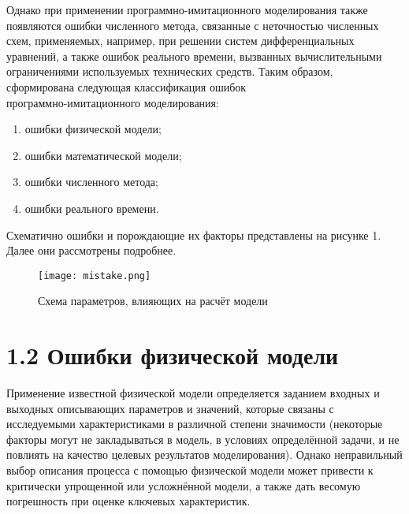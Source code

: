 {\begin{onehalfspace}
\begin{enumerate}
	\end{enumerate} 

 Однако при применении программно-имитационного моделирования также появляются ошибки численного метода, связанные с неточностью численных схем, применяемых, например, при решении систем дифференциальных уравнений, а также ошибок реального времени, вызванных вычислительными ограничениями используемых технических средств.
Таким образом, сформирована следующая классификация ошибок \\ программно-имитационного моделирования:
\begin{enumerate}
	\item	ошибки физической модели;
\item	ошибки математической модели;
\item	ошибки численного метода;
\item	ошибки реального времени.
\end{enumerate} 

   
Схематично ошибки и порождающие их факторы представлены на рисунке 1. Далее они рассмотрены подробнее.
 
		\begin{center}
		\begin{figure}[h]
			\centering
			\texttt{[image: mistake.png]}
			\caption{Схема параметров, влияющих на расчёт модели}
			\label{fig:model2}
		\end{figure}
	\end{center}
     
    \section*{\large{1.2	Ошибки физической модели}}
    Применение известной физической модели определяется заданием входных и выходных описывающих параметров и значений, которые связаны с исследуемыми характеристиками в различной степени значимости (некоторые факторы могут не закладываться в модель, в условиях определённой задачи, и не повлиять на качество целевых результатов моделирования). Однако неправильный выбор описания процесса с помощью физической модели может привести к критически упрощенной или усложнённой модели, а также дать весомую погрешность при оценке ключевых характеристик.



   
    

\end{onehalfspace}}
